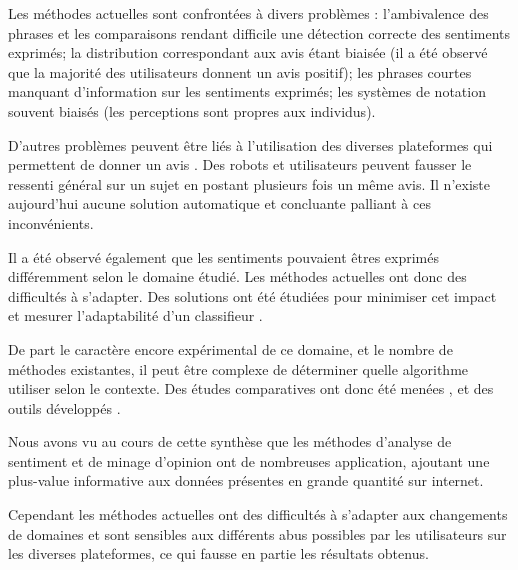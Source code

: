 \documentclass[8pt]{article}
\begin{document}
\begin{multicols}{2}
\par Les méthodes actuelles sont confrontées à divers problèmes \cite{ressource8}: l’ambivalence des phrases et les comparaisons rendant difficile une détection correcte des sentiments exprimés; la distribution correspondant aux avis étant biaisée (il a été observé que la majorité des utilisateurs donnent un avis positif); les phrases courtes manquant d’information sur les sentiments exprimés; les systèmes de notation souvent biaisés (les perceptions sont propres aux individus).
\par D’autres problèmes peuvent être liés à l’utilisation des diverses plateformes qui permettent de donner un avis \cite{ressource5}. Des robots et utilisateurs peuvent fausser le ressenti général sur un sujet en postant plusieurs fois un même avis. Il n’existe aujourd’hui aucune solution automatique et concluante palliant à ces inconvénients.
\par Il a été observé également que les sentiments pouvaient êtres exprimés différemment selon le domaine étudié. Les méthodes actuelles ont donc des difficultés à s’adapter. Des solutions ont été étudiées pour minimiser cet impact et mesurer l’adaptabilité d’un classifieur \cite{ressource15}.
\par De part le caractère encore expérimental de ce domaine, et le nombre de méthodes existantes, il peut être complexe de déterminer quelle algorithme utiliser selon le contexte. Des études comparatives ont donc été menées \cite{ressource29} \cite{ressource26}, et des outils développés \cite{ressource29} \cite{ressource19}.


\par Nous avons vu au cours de cette synthèse que les méthodes d’analyse de sentiment et de minage d’opinion ont de nombreuses application, ajoutant une plus-value informative aux données présentes en grande quantité sur internet.
\par Cependant les méthodes actuelles ont des difficultés à s’adapter aux changements de domaines et sont sensibles aux différents abus possibles par les utilisateurs sur les diverses plateformes, ce qui fausse en partie les résultats obtenus.


  \end{multicols}

  \newpage

  
  
  \nocite{*}
\end{document}

